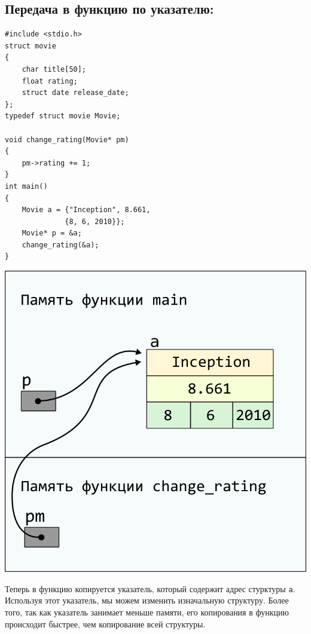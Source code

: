 \documentclass[10pt]{article}
\begin{document}
\subsection*{Передача в функцию по указателю:}
\begin{multicols}{2}
\begin{lstlisting}
#include <stdio.h>
struct movie 
{
    char title[50];
    float rating;
    struct date release_date;
};
typedef struct movie Movie;

void change_rating(Movie* pm) 
{
    pm->rating += 1;
}
int main() 
{
    Movie a = {"Inception", 8.661, 
              {8, 6, 2010}};
    Movie* p = &a;
    change_rating(&a);
}
\end{lstlisting}
\columnbreak
\begin{center}
\includegraphics[scale=0.8]{../images/pointer_schemes/function_by_pointer.png}
\end{center}
\end{multicols}
Теперь в функцию копируется указатель, который содержит
адрес стурктуры \texttt{a}. Используя этот указатель, мы можем изменить изначальную структуру. Более того, так как указатель занимает меньше памяти, его копирования в функцию происходит быстрее, чем копирование всей структуры.
\end{document}
